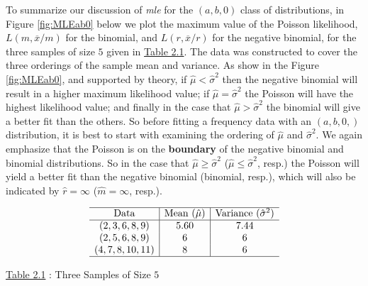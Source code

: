 \documentclass[]{book}
\theoremstyle{definition}
\theoremstyle{definition}
\theoremstyle{definition}
\theoremstyle{remark}
\begin{document}
To summarize our discussion of \emph{mle} for the \((a,b,0)\) class of
distributions, in Figure \ref{fig:MLEab0} below we plot the maximum
value of the Poisson likelihood, \(L(m,\overline{x}/m)\) for the
binomial, and \(L(r,\overline{x}/r)\) for the negative binomial, for the
three samples of size \(5\) given in \protect\hyperlink{tab:2.1}{Table
2.1}. The data was constructed to cover the three orderings of the
sample mean and variance. As show in the Figure \ref{fig:MLEab0}, and
supported by theory, if \(\hat{\mu}<\hat{\sigma}^2\) then the negative
binomial will result in a higher maximum likelihood value; if
\(\hat{\mu}=\hat{\sigma}^2\) the Poisson will have the highest
likelihood value; and finally in the case that
\(\hat{\mu}>\hat{\sigma}^2\) the binomial will give a better fit than
the others. So before fitting a frequency data with an \((a,b,0,)\)
distribution, it is best to start with examining the ordering of
\(\hat{\mu}\) and \(\hat{\sigma}^2\). We again emphasize that the
Poisson is on the \textbf{boundary} of the negative binomial and
binomial distributions. So in the case that
\(\hat{\mu}\geq\hat{\sigma}^2\) (\(\hat{\mu}\leq\hat{\sigma}^2\), resp.)
the Poisson will yield a better fit than the negative binomial
(binomial, resp.), which will also be indicated by \(\hat{r}=\infty\)
(\(\hat{m}=\infty\), resp.).

\[\begin{matrix}
\begin{array}{c|c|c}
\hline
\text{Data} & \text{Mean }(\hat{\mu}) & \text{Variance }(\hat{\sigma}^2) \\
\hline
(2,3,6,8,9) & 5.60 & 7.44 \\
(2,5,6,8,9) & 6 & 6\\
(4,7,8,10,11) & 8 & 6\\\hline
\end{array}
\end{matrix}\]

\protect\hyperlink{tab:2.1}{Table 2.1} : Three Samples of Size \(5\)
\end{document}
